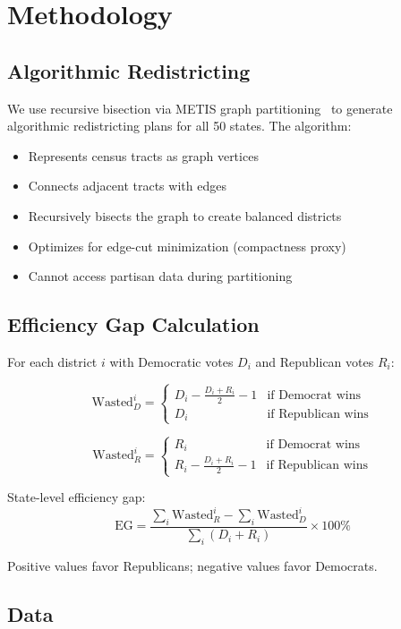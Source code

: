 \section{Methodology}

\subsection{Algorithmic Redistricting}

We use recursive bisection via METIS graph partitioning~\cite{karypis1998metis,deluca2026recursive} to generate algorithmic redistricting plans for all 50 states. The algorithm:
\begin{itemize}
\item Represents census tracts as graph vertices
\item Connects adjacent tracts with edges
\item Recursively bisects the graph to create balanced districts
\item Optimizes for edge-cut minimization (compactness proxy)
\item Cannot access partisan data during partitioning
\end{itemize}

\subsection{Efficiency Gap Calculation}

For each district $i$ with Democratic votes $D_i$ and Republican votes $R_i$:

\[
\text{Wasted}_D^i = \begin{cases}
D_i - \frac{D_i + R_i}{2} - 1 & \text{if Democrat wins} \\
D_i & \text{if Republican wins}
\end{cases}
\]

\[
\text{Wasted}_R^i = \begin{cases}
R_i & \text{if Democrat wins} \\
R_i - \frac{D_i + R_i}{2} - 1 & \text{if Republican wins}
\end{cases}
\]

State-level efficiency gap:
\[
\text{EG} = \frac{\sum_i \text{Wasted}_R^i - \sum_i \text{Wasted}_D^i}{\sum_i (D_i + R_i)} \times 100\%
\]

Positive values favor Republicans; negative values favor Democrats.

\subsection{Data}

